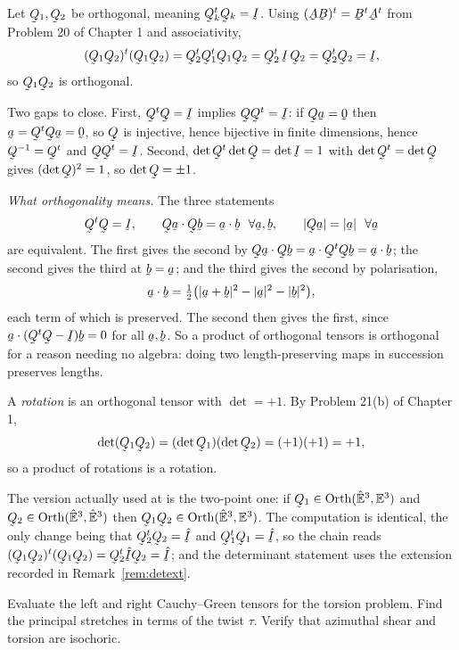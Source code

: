 \begin{solution}
Let $\bQ_{1},\bQ_{2}$ be orthogonal, meaning $\bQ_{k}^{t}\bQ_{k}=\I$.
Using $(\bA\bB)^{t}=\bB^{t}\bA^{t}$ from Problem 20 of Chapter 1 and
associativity,
\[
   (\bQ_{1}\bQ_{2})^{t}(\bQ_{1}\bQ_{2})
   =\bQ_{2}^{t}\bQ_{1}^{t}\bQ_{1}\bQ_{2}
   =\bQ_{2}^{t}\,\I\,\bQ_{2}
   =\bQ_{2}^{t}\bQ_{2}=\I ,
\]
so $\bQ_{1}\bQ_{2}$ is orthogonal.

Two gaps to close. First, $\bQ^{t}\bQ=\I$ implies $\bQ\bQ^{t}=\I$: if
$\bQ\ba=\bze$ then $\ba=\bQ^{t}\bQ\ba=\bze$, so $\bQ$ is injective, hence
bijective in finite dimensions, hence $\bQ^{-1}=\bQ^{t}$ and
$\bQ\bQ^{t}=\I$. Second, $\det\bQ^{t}\det\bQ=\det\I=1$ with
$\det\bQ^{t}=\det\bQ$ gives $(\det\bQ)^{2}=1$, so $\det\bQ=\pm1$.

\emph{What orthogonality means.} The three statements
\[
   \bQ^{t}\bQ=\I,
   \qquad
   \ip{\bQ\ba}{\bQ\bb}=\ip\ba\bb\ \ \forall\ba,\bb,
   \qquad
   |\bQ\ba|=|\ba|\ \ \forall\ba
\]
are equivalent. The first gives the second by
$\ip{\bQ\ba}{\bQ\bb}=\ip{\ba}{\bQ^{t}\bQ\bb}=\ip\ba\bb$; the second gives
the third at $\bb=\ba$; and the third gives the second by polarisation,
\[
   \ip\ba\bb=\tfrac12\big(|\ba+\bb|^{2}-|\ba|^{2}-|\bb|^{2}\big),
\]
each term of which is preserved. The second then gives the first, since
$\ip{\ba}{(\bQ^{t}\bQ-\I)\bb}=0$ for all $\ba,\bb$. So a product of
orthogonal tensors is orthogonal for a reason needing no algebra: doing
two length-preserving maps in succession preserves lengths.

A \emph{rotation} is an orthogonal tensor with $\det=+1$. By Problem 21(b)
of Chapter 1,
\[
   \det(\bQ_{1}\bQ_{2})=(\det\bQ_{1})(\det\bQ_{2})=(+1)(+1)=+1 ,
\]
so a product of rotations is a rotation.

The version actually used at  is the two-point one: if
$\bQ_{1}\in\Orth(\hVt,\Vt)$ and $\bQ_{2}\in\Orth(\hVt,\hVt)$ then
$\bQ_{1}\bQ_{2}\in\Orth(\hVt,\Vt)$. The computation is identical, the
only change being that $\bQ_{2}^{t}\bQ_{2}=\hI$ and
$\bQ_{1}^{t}\bQ_{1}=\hI$, so the chain reads
$(\bQ_{1}\bQ_{2})^{t}(\bQ_{1}\bQ_{2})=\bQ_{2}^{t}\hI\bQ_{2}=\hI$; and
the determinant statement uses the extension recorded in
Remark~\ref{rem:detext}.
\end{solution}

\begin{problem}
Evaluate the left and right Cauchy--Green tensors for the torsion problem.
Find the principal stretches in terms of the twist $\tau$. Verify that
azimuthal shear and torsion are isochoric.
\end{problem}

